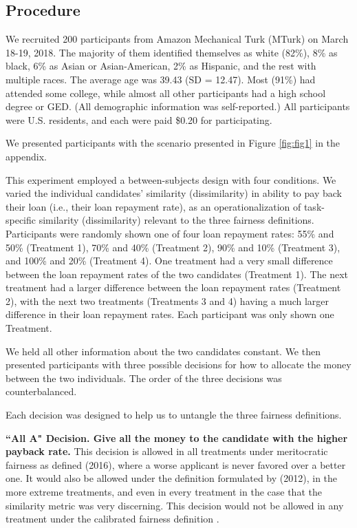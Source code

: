 \documentclass[letterpaper]{article} %
\begin{document}
\subsection{Procedure}
We recruited 200 participants from Amazon Mechanical Turk (MTurk) on March 18-19, 2018. The majority of them identified themselves as white (82\%), 8\% as black, 6\% as Asian or Asian-American, 2\% as Hispanic, and the rest with multiple races. The average age was 39.43 (SD = 12.47). Most (91\%) had attended some college, while almost all other participants had a high school degree or GED. (All demographic information was self-reported.) All participants were U.S. residents, and each were paid \$0.20 for participating.

We presented participants with the scenario presented in Figure \ref{fig:fig1} in the appendix.


This experiment employed a between-subjects design with four conditions. We varied the individual candidates' similarity (dissimilarity) in ability to pay back their loan (i.e., their loan repayment rate), as an operationalization of task-specific similarity (dissimilarity) relevant to the three fairness definitions. Participants were randomly shown one of four loan repayment rates: 55\% and 50\% (Treatment 1), 70\% and 40\% (Treatment 2), 90\% and 10\% (Treatment 3), and 100\% and 20\% (Treatment 4). One treatment had a very small difference between the loan repayment rates of the two candidates (Treatment 1). The next treatment had a larger difference between the loan repayment rates (Treatment 2), with the next two treatments (Treatments 3 and 4) having a much larger difference in their loan repayment rates. Each participant was only shown one Treatment. 
 
We held all other information about the two candidates constant. We then presented participants with three possible decisions for how to allocate the money between the two individuals. The order of the three decisions was counterbalanced. 
 
 Each decision was designed to help us to untangle the three fairness definitions.
 


\noindent
 \textbf{``All A" Decision. Give all the money to the candidate with the higher payback rate.} 
 This decision is allowed in all treatments under meritocratic fairness as defined \citeauthor{joseph2016fairness} (2016), where a worse applicant is never favored over a better one. It would also be allowed under the definition formulated by \citeauthor{dwork2012fairness} (2012), in the more extreme treatments, and even in every treatment in the case that the similarity metric was very discerning. This decision would not be allowed in any treatment under the calibrated fairness definition \cite{liu2017calibrated}. 
 
\end{document}
